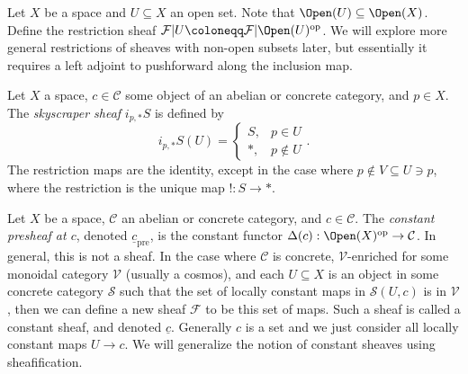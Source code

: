 Let $X$ be a space and $U\subseteq X$ an open set. Note that $\Open(U) \subseteq \Open(X) $. Define the restriction sheaf $\mathcal{F} |U\coloneqq \mathcal{F} |\Open(U) ^{\mathrm{op}} $. We will explore more general restrictions of sheaves with non-open subsets later, but essentially it requires a left adjoint to pushforward along the inclusion map.

\begin{example}
	Let $X$ a space, $c\in \mathcal{C} $ some object of an abelian or concrete category, and $p\in X$. The \emph{skyscraper sheaf} $i_{p,*} S$ is defined by
	\[
		i_{p,*} S(U)=
		\begin{cases}
			S,&p\in U\\
			*,&p\notin U
		\end{cases}
	.\]
	The restriction maps are the identity, except in the case where $p\notin V\subseteq U\ni p$, where the restriction is the unique map $!: S \to *$.
\end{example}

\begin{example}
	Let $X$ be a space, $\mathcal{C} $ an abelian or concrete category, and $c\in \mathcal{C} $. The \emph{constant presheaf at $c$}, denoted $\underline{c}_{\mathrm{pre} } $, is the constant functor $\Delta (c): \Open(X) ^{\mathrm{op}}  \to \mathcal{C} $. In general, this is not a sheaf. In the case where $\mathcal{C} $ is concrete, $\mathcal{V} $-enriched for some monoidal category $\mathcal{V} $ (usually a cosmos), and each $U\subseteq X$ is an object in some concrete category $\mathcal{S} $ such that the set of locally constant maps in $\mathcal{S} (U,c)$ is in $\mathcal{V} $, then we can define a new sheaf $\mathcal{F} $ to be this set of maps. Such a sheaf is called a constant sheaf, and denoted $\underline{c} $. Generally $c$ is a set and we just consider all locally constant maps $U\to c$. We will generalize the notion of constant sheaves using sheafification.
\end{example}

